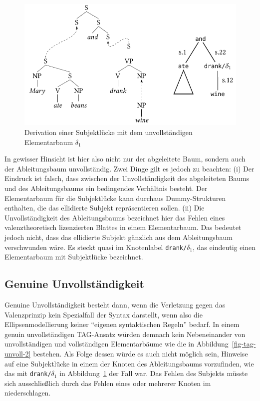 \begin{figure}[t]
\centering
\includegraphics{graphics/abb832.pdf}
\caption{\label{fig-tag-unvoll-3}Derivation einer Subjektlücke mit dem unvollständigen Elementarbaum $\delta_1$}
\end{figure}
In gewisser Hinsicht ist hier also nicht nur der abgeleitete Baum, sondern auch der Ableitungsbaum unvollständig. Zwei Dinge gilt es jedoch zu beachten: (i) Der Eindruck ist falsch, dass zwischen der Unvollständigkeit des abgeleiteten Baums und des Ableitungsbaums ein bedingendes Verhältnis besteht. Der Elementarbaum für die Subjektlücke kann durchaus Dummy-Strukturen enthalten, die das ellidierte Subjekt repräsentieren sollen. (ii) Die Unvollständigkeit des Ableitungsbaums bezeichnet hier das Fehlen eines valenztheoretisch lizenzierten Blattes in einem Elementarbaum. Das bedeutet jedoch nicht, dass das ellidierte Subjekt gänzlich aus dem Ableitungsbaum verschwunden wäre. Es steckt quasi im Knotenlabel {\tt drank/$\delta_1$}, das eindeutig einen Elementarbaum mit Subjektlücke bezeichnet. 




\subsection{Genuine Unvollständigkeit}

Genuine Unvollständigkeit besteht dann, wenn die Verletzung gegen das Valenzprinzip kein Spezialfall der Syntax darstellt, wenn also die Ellipsenmodellierung keiner "`eigenen syntaktischen Regeln"' bedarf. In einem genuin unvollständigen TAG-Ansatz würden demnach kein Nebeneinander von unvollständigen und vollständigen Elementarbäume wie die in Abbildung~\ref{fig-tag-unvoll-2} bestehen. Als Folge dessen würde es auch nicht möglich sein, Hinweise auf eine Subjektlücke in einem der Knoten des Ableitungsbaums vorzufinden, wie das mit {\tt drank/$\delta_1$} in Abbildung~\ref{fig-tag-unvoll-3} der Fall war. Das Fehlen des Subjekts müsste sich ausschlie\ss lich durch das Fehlen eines oder mehrerer Knoten im  niederschlagen. 

